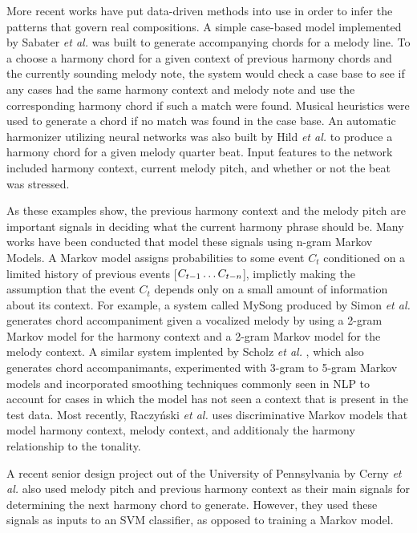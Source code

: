 \documentclass{sig-alternate}
\begin{document}
More recent works have put data-driven methods into use in order to infer the patterns that govern real compositions. A simple case-based model implemented by Sabater \textit{et al.} \cite{Sabater98usingrules} was built to generate
accompanying chords for a melody line. To a choose a harmony chord for a given context of previous
harmony chords and the currently sounding melody note, the system would check a case base to see if any
cases had the same harmony context and melody note and use the corresponding harmony chord if such a 
match were found. Musical heuristics were used to generate a chord if no match was found in the case base.
An automatic harmonizer utilizing neural networks was also built by Hild \textit{et al.} \cite{NIPS1991_576}  to produce a harmony
chord for a given melody quarter beat. Input features to the network included harmony context, current melody pitch,
and whether or not the beat was stressed.

As these examples show, the previous harmony context and the melody pitch are important signals in deciding
what the current harmony phrase should be. Many works have been conducted that model these signals using
n-gram Markov Models. A Markov model assigns probabilities to some event $C_{t}$ conditioned on a limited history
of previous events [$C_{t-1}\ldots\\
C_{t-n}$], implictly making the assumption that the event $C_{t}$ depends only on a 
small amount of information about its context. For example, a system called MySong produced by Simon \textit{et al.} \cite{export:64277}
generates chord accompaniment given a vocalized melody by using a 2-gram Markov model for the harmony
context and a 2-gram Markov model for the melody context. A similar system implented by Scholz \textit{et al.} \cite{4959518},
which also generates chord accompanimants, experimented with 3-gram to 5-gram Markov models and incorporated
smoothing techniques commonly seen in NLP to account for cases in which the model has not seen a context
that is present in the test data. Most recently, Raczy\'{n}ski \textit{et al.} \cite{doi:10.1080/09298215.2013.822000} uses discriminative Markov models that
model harmony context, melody context, and additionaly the harmony relationship to the tonality.

A recent senior design project out of the University of Pennsylvania by Cerny \textit{et al.} \cite{UAMP} also used melody pitch and previous harmony context
as their main signals for determining the next harmony chord to generate. However, they used these
signals as inputs to an SVM classifier, as opposed to training a Markov model. 
\end{document}
